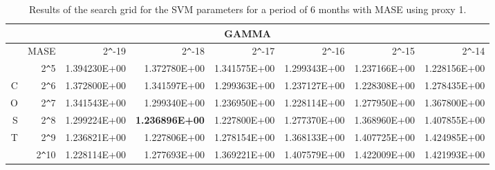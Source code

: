 \begin{table}[h!]
\centering
\begin{adjustbox}{width=\textwidth}
\begin{tabular}{|r|r|rrrrrr|}
\hline
\multicolumn{8}{|c|}{GAMMA} \tabularnewline
\hline
 &MASE& 2\verb|^|-19 & 2\verb|^|-18 & 2\verb|^|-17 & 2\verb|^|-16 & 2\verb|^|-15 & 2\verb|^|-14 \\ 
  \hline
  &2\verb|^|5 & 1.394230E+00 & 1.372780E+00 & 1.341575E+00 & 1.299343E+00 & 1.237166E+00 & 1.228156E+00 \\ 
  C&2\verb|^|6 & 1.372800E+00 & 1.341597E+00 & 1.299363E+00 & 1.237127E+00 & 1.228308E+00 & 1.278435E+00 \\ 
  O&2\verb|^|7 & 1.341543E+00 & 1.299340E+00 & 1.236950E+00 & 1.228114E+00 & 1.277950E+00 & 1.367800E+00 \\ 
  S&2\verb|^|8 & 1.299224E+00 & \textbf{1.236896E+00} & 1.227800E+00 & 1.277370E+00 & 1.368960E+00 & 1.407855E+00 \\ 
  T&2\verb|^|9 & 1.236821E+00 & 1.227806E+00 & 1.278154E+00 & 1.368133E+00 & 1.407725E+00 & 1.424985E+00 \\ 
  &2\verb|^|10 & 1.228114E+00 & 1.277693E+00 & 1.369221E+00 & 1.407579E+00 & 1.422009E+00 & 1.421993E+00 \\ 
   \hline
\end{tabular}
\end{adjustbox}
\caption{Results of the search grid for the SVM parameters for a period of 6 months with MASE using proxy 1.}
\end{table}